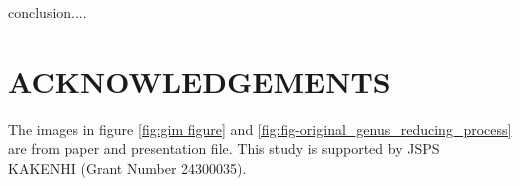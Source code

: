 \documentclass[a4paper,twoside]{article}
\begin{document}
\noindent conclusion....



\section*{\uppercase{Acknowledgements}}
\noindent The images in figure \ref{fig:gim figure} and \ref{fig:fig-original_genus_reducing_process}  are from \cite{Gu:2002:GI:566654.566589} paper and presentation file. This study is supported by JSPS KAKENHI (Grant Number 24300035).


\vfill

{\small
}
\vfill

\begin{figure}[th!]
	\centering		
	\hspace{5pt}
	\hspace{10pt}
	\hspace{5pt}

\end{figure}
\end{document}
